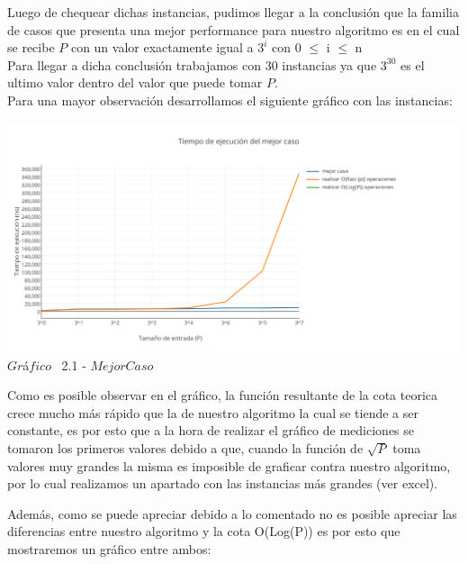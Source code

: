 Luego de chequear dichas instancias, pudimos llegar a la conclusi\'on que la familia de casos que presenta una mejor performance para nuestro algoritmo
es en el cual se recibe $P$ con un valor exactamente igual a $3^i$ con 0 $\leq$ i $\leq$ n \\

Para llegar a dicha conclusi\'on trabajamos con 30 instancias ya que $3^{30}$ es el ultimo valor dentro del valor que puede tomar $P$.\\

Para una mayor observaci\'on desarrollamos el siguiente gr\'afico con las instancias:\\

\vspace*{0.3cm} \vspace*{0.3cm}
  \begin{center}
 \includegraphics[scale=0.65]{./EJ2/mejorcaso.png}
 {$Gr$\'a$fico$ \ 2.1 - $Mejor Caso$}
  \end{center}
  \vspace*{0.3cm}
  
Como es posible observar en el gr\'afico, la funci\'on resultante de la cota teorica crece mucho m\'as r\'apido que la de nuestro algoritmo la cual se tiende a ser constante, es por esto que a la hora de realizar el gr\'afico de mediciones se tomaron los primeros valores debido a que, cuando la funci\'on de $\sqrt{P}$ toma valores muy grandes la misma es imposible de graficar contra nuestro algoritmo, por lo cual realizamos un apartado con las instancias m\'as grandes (ver excel).

Adem\'as, como se puede apreciar debido a lo comentado no es posible apreciar las diferencias entre nuestro algoritmo y la cota O(Log(P)) es por esto que mostraremos un gr\'afico entre ambos:\\

